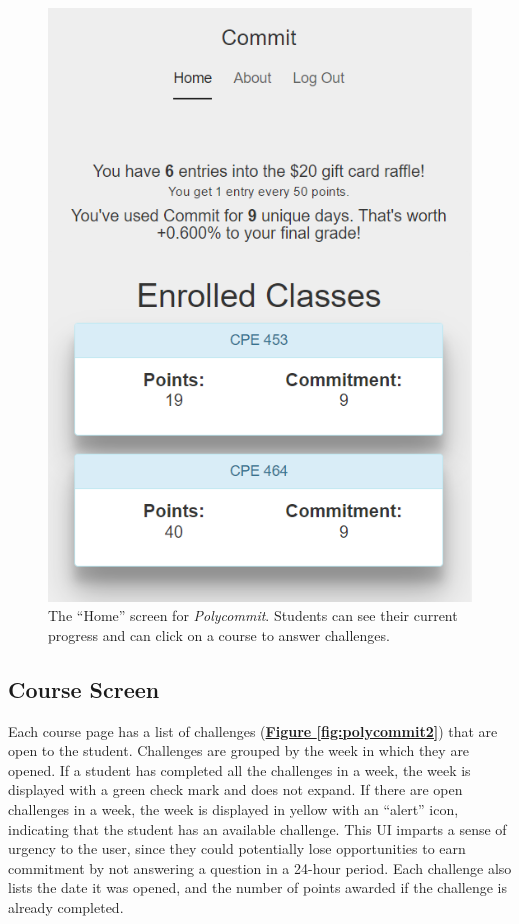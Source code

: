 \begin{figure}[h]
	\includegraphics{figures/polycommit-screen}
	\caption{The ``Home'' screen for \textit{Polycommit}. Students can see their current progress and can click on a course to answer challenges.}
	\label{fig:polycommit1}
\end{figure}

\subsection{Course Screen}
\par Each course page has a list of challenges (\textbf{\hyperref[fig:polycommit2]{Figure \ref*{fig:polycommit2}}}) that are open to the student. Challenges are grouped by the week in which they are opened. If a student has completed all the challenges in a week, the week is displayed with a green check mark and does not expand. If there are open challenges in a week, the week is displayed in yellow with an ``alert'' icon, indicating that the student has an available challenge. This UI imparts a sense of urgency to the user, since they could potentially lose opportunities to earn commitment by not answering a question in a 24-hour period. Each challenge also lists the date it was opened, and the number of points awarded if the challenge is already completed.

